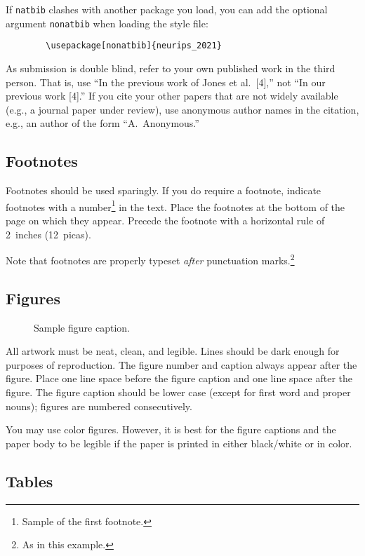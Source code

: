 \documentclass{article}
\begin{document}
	If \verb+natbib+ clashes with another package you load, you can add the optional
	argument \verb+nonatbib+ when loading the style file:
	\begin{verbatim}
		\usepackage[nonatbib]{neurips_2021}
	\end{verbatim}
	
	As submission is double blind, refer to your own published work in the third
	person. That is, use ``In the previous work of Jones et al.\ [4],'' not ``In our
	previous work [4].'' If you cite your other papers that are not widely available
	(e.g., a journal paper under review), use anonymous author names in the
	citation, e.g., an author of the form ``A.\ Anonymous.''
	
	\subsection{Footnotes}
	
	Footnotes should be used sparingly.  If you do require a footnote, indicate
	footnotes with a number\footnote{Sample of the first footnote.} in the
	text. Place the footnotes at the bottom of the page on which they appear.
	Precede the footnote with a horizontal rule of 2~inches (12~picas).
	
	Note that footnotes are properly typeset \emph{after} punctuation
	marks.\footnote{As in this example.}
	
	\subsection{Figures}
	
	\begin{figure}
		\centering
		\fbox{\rule[-.5cm]{0cm}{4cm} \rule[-.5cm]{4cm}{0cm}}
		\caption{Sample figure caption.}
	\end{figure}
	
	All artwork must be neat, clean, and legible. Lines should be dark enough for
	purposes of reproduction. The figure number and caption always appear after the
	figure. Place one line space before the figure caption and one line space after
	the figure. The figure caption should be lower case (except for first word and
	proper nouns); figures are numbered consecutively.
	
	You may use color figures.  However, it is best for the figure captions and the
	paper body to be legible if the paper is printed in either black/white or in
	color.
	
	\subsection{Tables}
	
\end{document}

